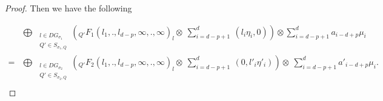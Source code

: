 \documentclass[10pt]{amsart}
\numberwithin{equation}{subsection}
\begin{document}
\begin{proof}
Then we have the following 

\begin{equation}\label{eqn_Gluing}
\begin{aligned}
&\bigoplus_{\begin{array}{cc}
&  l\in DG_{\sigma_1}\\
& Q'\in S_{\sigma_1,Q}
\end{array}} ({}_{Q'}F_{1}(l_1,.,l_{d-p},\infty,.,\infty)_{l} \otimes\ \sum_{i=d-p+1}^{d}\ (l_i\eta_i,0)) \otimes \sum_{i=d-p+1}^{d}a_{i-d+p}\mu_{i} \\
=&\bigoplus_{{\begin{array}{cc}
     &  l\in DG_{\sigma_2}\\
     & Q'\in S_{\sigma_2,Q}
\end{array}}}({}_{Q'}F_{2}(l_1,.,l_{d-p},\infty,.,\infty)_{l}\otimes\  \sum_{i=d-p+1}^{d} \ (0,l'_i\eta'_i))\otimes\ \sum_{i=d-p+1}^{d}a'_{i-d+p}\mu_{i}.\\ %
\end{aligned}
\end{equation}
\end{proof}
\end{document}
